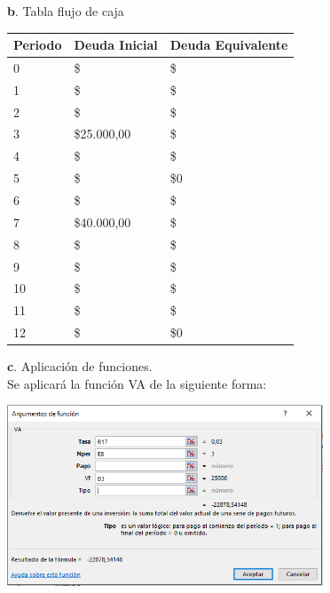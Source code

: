 \textbf{b}. Tabla flujo de caja
\begin{spacing}{1.1}
    \begin{center}
        \begin{tabular}{|p{4cm}|p{4cm}|p{4cm}|}
        \hline 
            \textbf{Periodo} & \textbf{Deuda Inicial} & \textbf{Deuda Equivalente} \\ \hline                       
       
            0 & \$  &\$  \\ \hline
            1 & \$ &\$  \\ \hline
            2 & \$ & \$  \\ \hline
            3 & \$25.000,00  & \$ \\ \hline
            4 & \$  &\$  \\ \hline
            5 & \$ &\$0  \\ \hline
            6 & \$ & \$ \\ \hline
            7 & \$40.000,00  & \$ \\ \hline
            8 & \$&\$   \\ \hline
            9 & \$ &\$  \\ \hline
            10 & \$ & \$ \\ \hline
            11 & \$  & \$ \\ \hline
            12 & \$  & \$0 \\ \hline    

 
\end{tabular}
\end{center}
\end{spacing}

\textbf{c}. Aplicación de funciones.
 \\
 
Se aplicará la función VA de la siguiente forma:     
 
 \begin{center}
	\includegraphics[height=5.4cm]{img/ch8/8_2.png}
\end{center}

